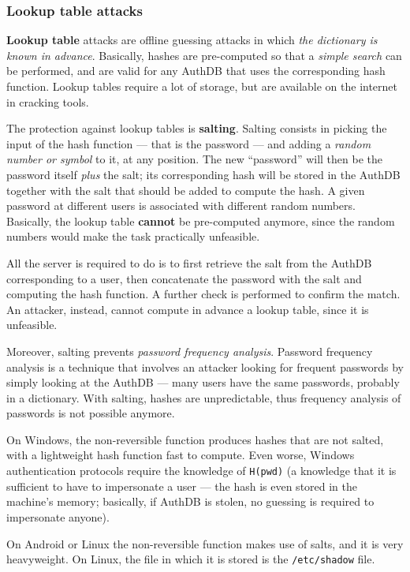 \documentclass[10pt]{\classname}
\begin{document}
\subsubsection{Lookup table attacks}

\textbf{Lookup table} attacks are offline guessing attacks in which \emph{the dictionary
is known in advance}. Basically, hashes are pre\--computed so that a
\emph{simple search} can be performed, and are valid for any AuthDB that uses
the corresponding hash function. Lookup tables require a lot of storage, but
are available on the internet in cracking tools.

The protection against lookup tables is \textbf{salting}. Salting consists in
picking the input of the hash function --- that is the password --- and adding a
\emph{random number or symbol} to it, at any position. The new ``password''
will then be the password itself \emph{plus} the salt; its corresponding
hash will be stored in the AuthDB together with the salt that should be added
to compute the hash. A given password at different users is associated with
different random numbers. Basically, the lookup table \textbf{cannot} be
pre\--computed anymore, since the random numbers would make the task
practically unfeasible.

All the server is required to do is to first retrieve the salt from the AuthDB
corresponding to a user, then concatenate the password with the salt and
computing the hash function. A further check is performed to confirm the match.
An attacker, instead, cannot compute in advance a lookup table, since it is
unfeasible.

Moreover, salting prevents \emph{password frequency analysis}. Password
frequency analysis is a technique that involves an attacker looking for
frequent passwords by simply looking at the AuthDB --- many users have the same
passwords, probably in a dictionary. With salting, hashes are unpredictable,
thus frequency analysis of passwords is not possible anymore.

On Windows, the non\--reversible function produces hashes that are not salted, with a
lightweight hash function fast to compute. Even worse, Windows authentication
protocols require the knowledge of \texttt{H(pwd)} (a knowledge that it is
sufficient to have to impersonate a user --- the hash is even stored in the
machine's memory; basically, if AuthDB is stolen, no guessing is required to
impersonate anyone).

On Android or Linux the non\--reversible function makes use of salts, and it is
very heavyweight. On Linux, the file in which it is stored is the
\texttt{/etc/shadow} file.
\end{document}
